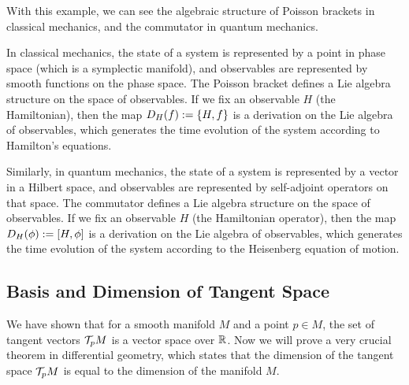 With this example, we can see the algebraic structure of Poisson brackets in classical mechanics, and the commutator in quantum mechanics.
\begin{remark}
	In classical mechanics, the state of a system is represented by a point in phase space (which is a symplectic manifold), and observables are represented by smooth functions on the phase space. The Poisson bracket defines a Lie algebra structure on the space of observables. If we fix an observable \(H\) (the Hamiltonian), then the map \(D_H(f) := \acomm{H}{f}\) is a derivation on the Lie algebra of observables, which generates the time evolution of the system according to Hamilton's equations.
\end{remark}
\begin{remark}
	Similarly, in quantum mechanics, the state of a system is represented by a vector in a Hilbert space, and observables are represented by self-adjoint operators on that space. The commutator defines a Lie algebra structure on the space of observables. If we fix an observable \(H\) (the Hamiltonian operator), then the map \(D_H(\phi) := \comm{H}{\phi}\) is a derivation on the Lie algebra of observables, which generates the time evolution of the system according to the Heisenberg equation of motion.
\end{remark}

\subsection{Basis and Dimension of Tangent Space}

We have shown that for a smooth manifold \(M\) and a point \(p \in M\), the set of tangent vectors \(\mathcal T_p M\) is a vector space over \(\mathbb R\). Now we will prove a very crucial theorem in differential geometry, which states that the dimension of the tangent space \(\mathcal T_p M\) is equal to the dimension of the manifold \(M\).


